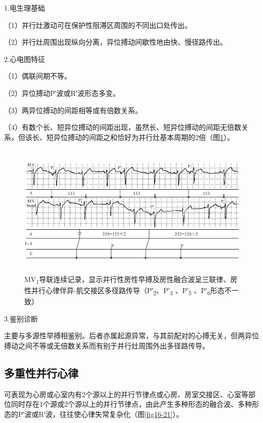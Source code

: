 1.电生理基础

（1）并行灶激动可在保护性阻滞区周围的不同出口处传出。

（2）并行灶周围出现纵向分离，异位搏动间歇性地由快、慢径路传出。

2.心电图特征

（1）偶联间期不等。

（2）异位搏动P′波或R′波形态多变。

（3）两异位搏动的间距相等或有倍数关系。

（4）有数个长、短异位搏动的间距出现，虽然长、短异位搏动的间距无倍数关系，但该长、短异位搏动的间距之和恰好为并行灶基本周期的2倍（图\ref{fig16-20}）。

\begin{figure}[!htbp]
 \centering
 \includegraphics[width=5.64583in,height=2.52083in]{./images/Image00296.jpg}
 \captionsetup{justification=centering}
 \caption{MV\textsubscript{1}导联连续记录，显示并行性房性早搏及房性融合波呈三联律、房性并行心律伴异-肌交接区多径路传导（P′\textsubscript{2}、P′\textsubscript{3} 、P′\textsubscript{5} 、P′\textsubscript{6}形态不一致）}
 \label{fig16-20}
  \end{figure} 


3.鉴别诊断

主要与多源性早搏相鉴别。后者亦属起源异常，与其前配对的心搏无关，但两异位搏动之间不等或无倍数关系而有别于并行灶周围外出多径路传导。

\protect\hypertarget{text00023.htmlux5cux23subid298}{}{}

\subsection{多重性并行心律}

可表现为心房或心室内有2个源以上的并行节律点或心房、房室交接区、心室等部位同时存在1个源或2个源以上的并行节律点，由此产生多种形态的融合波、多种形态的P′波或R′波，往往使心律失常复杂化（图\ref{fig16-21}）。

